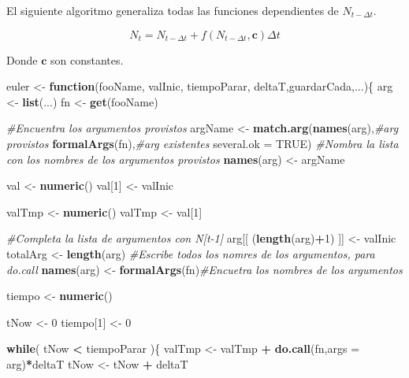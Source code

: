 \documentclass[12pt,letterpaper,]{book}
\newenvironment{Shaded}{\begin{snugshade}}{\end{snugshade}}
\newcommand{\KeywordTok}[1]{\textcolor[rgb]{0.13,0.29,0.53}{\textbf{#1}}}
\newcommand{\DataTypeTok}[1]{\textcolor[rgb]{0.13,0.29,0.53}{#1}}
\newcommand{\DecValTok}[1]{\textcolor[rgb]{0.00,0.00,0.81}{#1}}
\newcommand{\StringTok}[1]{\textcolor[rgb]{0.31,0.60,0.02}{#1}}
\newcommand{\CommentTok}[1]{\textcolor[rgb]{0.56,0.35,0.01}{\textit{#1}}}
\newcommand{\OtherTok}[1]{\textcolor[rgb]{0.56,0.35,0.01}{#1}}
\newcommand{\ControlFlowTok}[1]{\textcolor[rgb]{0.13,0.29,0.53}{\textbf{#1}}}
\newcommand{\OperatorTok}[1]{\textcolor[rgb]{0.81,0.36,0.00}{\textbf{#1}}}
\newcommand{\NormalTok}[1]{#1}
\begin{document}
El siguiente algoritmo generaliza todas las funciones dependientes de
\(N_{t-\Delta t}\).

\[
N_t= N_{t-\Delta t} + f \left( N_{t-\Delta t},\mathbf{c} \right) \Delta t
\]

Donde \(\mathbf{c}\) son constantes.

\begin{Shaded}
\begin{Highlighting}[]
\NormalTok{euler <-}\StringTok{ }\ControlFlowTok{function}\NormalTok{(fooName, valInic, tiempoParar, deltaT,guardarCada,...)\{}
\NormalTok{  arg <-}\StringTok{ }\KeywordTok{list}\NormalTok{(...)}
\NormalTok{  fn <-}\StringTok{ }\KeywordTok{get}\NormalTok{(fooName)}
  
  \CommentTok{#Encuentra los argumentos provistos}
\NormalTok{  argName <-}\StringTok{ }\KeywordTok{match.arg}\NormalTok{(}\KeywordTok{names}\NormalTok{(arg),}\CommentTok{#arg provistos}
                       \KeywordTok{formalArgs}\NormalTok{(fn),}\CommentTok{#arg existentes}
                       \DataTypeTok{several.ok =} \OtherTok{TRUE}\NormalTok{)}
  \CommentTok{#Nombra la lista con los nombres de los argumentos provistos}
  \KeywordTok{names}\NormalTok{(arg) <-}\StringTok{ }\NormalTok{argName}
  
\NormalTok{  val <-}\StringTok{ }\KeywordTok{numeric}\NormalTok{()}
\NormalTok{  val[}\DecValTok{1}\NormalTok{] <-}\StringTok{ }\NormalTok{valInic}
  
\NormalTok{  valTmp <-}\StringTok{ }\KeywordTok{numeric}\NormalTok{()}
\NormalTok{  valTmp <-}\StringTok{ }\NormalTok{val[}\DecValTok{1}\NormalTok{]}
  
  \CommentTok{#Completa la lista de argumentos con N[t-1]}
\NormalTok{  arg[[ (}\KeywordTok{length}\NormalTok{(arg)}\OperatorTok{+}\DecValTok{1}\NormalTok{) ]] <-}\StringTok{ }\NormalTok{valInic}
\NormalTok{  totalArg <-}\StringTok{ }\KeywordTok{length}\NormalTok{(arg)}
  \CommentTok{#Escribe todos los nomres de los argumentos, para do.call}
  \KeywordTok{names}\NormalTok{(arg) <-}\StringTok{ }\KeywordTok{formalArgs}\NormalTok{(fn)}\CommentTok{#Encuetra los nombres de los argumentos}
  
\NormalTok{  tiempo <-}\StringTok{ }\KeywordTok{numeric}\NormalTok{()}
  
\NormalTok{  tNow <-}\StringTok{ }\DecValTok{0}
\NormalTok{  tiempo[}\DecValTok{1}\NormalTok{] <-}\StringTok{ }\DecValTok{0}
  
  \ControlFlowTok{while}\NormalTok{( tNow }\OperatorTok{<}\StringTok{ }\NormalTok{tiempoParar )\{}
\NormalTok{    valTmp <-}\StringTok{ }\NormalTok{valTmp }\OperatorTok{+}\StringTok{ }\KeywordTok{do.call}\NormalTok{(fn,}\DataTypeTok{args =}\NormalTok{ arg)}\OperatorTok{*}\NormalTok{deltaT}
\NormalTok{    tNow <-}\StringTok{ }\NormalTok{tNow }\OperatorTok{+}\StringTok{ }\NormalTok{deltaT }
      

\end{Highlighting}
\end{Shaded}
\end{document}
